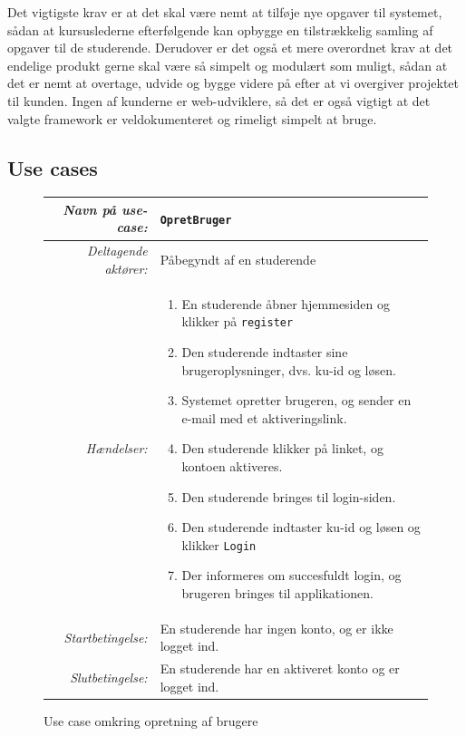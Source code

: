 \documentclass[12pt]{article}
\begin{document}
Det vigtigste krav er at det skal være nemt at tilføje nye opgaver til systemet, sådan at kursuslederne efterfølgende kan opbygge en tilstrækkelig samling af opgaver til de studerende. Derudover er det også et mere overordnet krav at det endelige produkt gerne skal være så simpelt og modulært som muligt, sådan at det er nemt at overtage, udvide og bygge videre på efter at vi overgiver projektet til kunden. Ingen af kunderne er web-udviklere, så det er også vigtigt at det valgte framework er veldokumenteret og rimeligt simpelt at bruge.

\subsection{Use cases}
\label{sub:use_cases}

\begin{figure}[htpb]
    \centering
    \begin{tabular}{r p{10cm}}
        \toprule
        \textit{Navn på use-case:} & \verb!OpretBruger! \\
        \hline
        \textit{Deltagende aktører:} & Påbegyndt af en studerende \\
        \hline
        \textit{Hændelser:} & \begin{enumerate}[nolistsep]
            \item En studerende åbner hjemmesiden og klikker på \verb!register!
            \item Den studerende indtaster sine brugeroplysninger, dvs. ku-id og løsen.
            \item Systemet opretter brugeren, og sender en e-mail med et aktiveringslink.
            \item Den studerende klikker på linket, og kontoen aktiveres.
            \item Den studerende bringes til login-siden.
            \item Den studerende indtaster ku-id og løsen og klikker \verb!Login!
            \item Der informeres om succesfuldt login, og brugeren bringes til applikationen.
        \end{enumerate}  \\
        \hline
        \textit{Startbetingelse:} & En studerende har ingen konto, og er ikke logget ind. \\
        \hline
        \textit{Slutbetingelse:} & En studerende har en aktiveret konto og er logget ind. \\
        \bottomrule
    \end{tabular}
    \caption{Use case omkring opretning af brugere}
    \label{fig:use_case1}
\end{figure}
\end{document}
